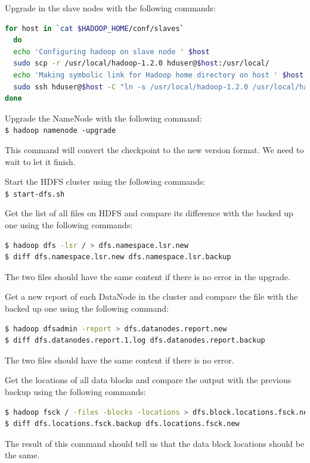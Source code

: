 Upgrade in the slave nodes with the following commands:
\lstset{style=bashstyle}
\begin{lstlisting}[language=bash]
for host in `cat $HADOOP_HOME/conf/slaves`
  do
  echo 'Configuring hadoop on slave node ' $host
  sudo scp -r /usr/local/hadoop-1.2.0 hduser@$host:/usr/local/
  echo 'Making symbolic link for Hadoop home directory on host ' $host
  sudo ssh hduser@$host -C "ln -s /usr/local/hadoop-1.2.0 /usr/local/hadoop"
done
\end{lstlisting}

Upgrade the NameNode with the following command: \\
\verb|$ hadoop namenode -upgrade| 

This command will convert the checkpoint to the new version format. We need to wait to let it finish.

Start the HDFS cluster using the following commands: \\
\verb|$ start-dfs.sh| 

Get the list of all files on HDFS and compare its difference with the backed up one using the following commands:
\lstset{style=bashstyle}
\begin{lstlisting}[language=bash]
$ hadoop dfs -lsr / > dfs.namespace.lsr.new
$ diff dfs.namespace.lsr.new dfs.namespace.lsr.backup
\end{lstlisting}

The two files should have the same content if there is no error in the upgrade. 

Get a new report of each DataNode in the cluster and compare the file with the backed up one using the following command:
\lstset{style=bashstyle}
\begin{lstlisting}[language=bash]
$ hadoop dfsadmin -report > dfs.datanodes.report.new
$ diff dfs.datanodes.report.1.log dfs.datanodes.report.backup
\end{lstlisting}

The two files should have the same content if there is no error.

Get the locations of all data blocks and compare the output with the previous backup using the following commands:
\lstset{style=bashstyle}
\begin{lstlisting}[language=bash]
$ hadoop fsck / -files -blocks -locations > dfs.block.locations.fsck.new
$ diff dfs.locations.fsck.backup dfs.locations.fsck.new
\end{lstlisting}

The result of this command should tell us that the data block locations should be the same. 

